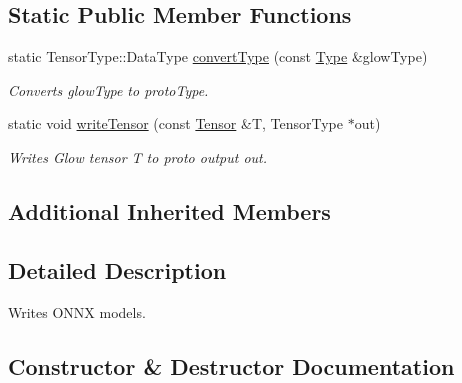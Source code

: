 \subsection*{Static Public Member Functions}
\begin{DoxyCompactItemize}
\item 
\mbox{\label{classglow_1_1_o_n_n_x_model_writer_af3d16c64b9f3ef9ed09f6a944b57f297}} 
static Tensor\+Type\+::\+Data\+Type \hyperlink{classglow_1_1_o_n_n_x_model_writer_af3d16c64b9f3ef9ed09f6a944b57f297}{convert\+Type} (const \hyperlink{structglow_1_1_type}{Type} \&glow\+Type)
\begin{DoxyCompactList}\small\item\em Converts {\ttfamily glow\+Type} to {\ttfamily proto\+Type}. \end{DoxyCompactList}\item 
\mbox{\label{classglow_1_1_o_n_n_x_model_writer_a7948cce1f32d12474ce4eabd1baca18e}} 
static void \hyperlink{classglow_1_1_o_n_n_x_model_writer_a7948cce1f32d12474ce4eabd1baca18e}{write\+Tensor} (const \hyperlink{classglow_1_1_tensor}{Tensor} \&T, Tensor\+Type $\ast$out)
\begin{DoxyCompactList}\small\item\em Writes Glow tensor {\ttfamily T} to proto output {\ttfamily out}. \end{DoxyCompactList}\end{DoxyCompactItemize}
\subsection*{Additional Inherited Members}


\subsection{Detailed Description}
Writes O\+N\+NX models. 

\subsection{Constructor \& Destructor Documentation}
\mbox{\label{classglow_1_1_o_n_n_x_model_writer_a206d9db5afaa32748fc0d7dab0dedc7f}} 
